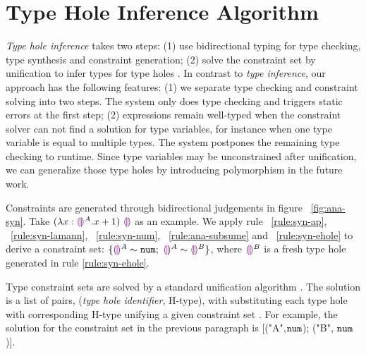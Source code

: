 \section{Type Hole Inference Algorithm}
\label{sec:infalg}
\emph{Type hole inference} takes two steps: (1) use bidirectional typing for type checking, type synthesis and constraint generation; (2) solve the constraint set by unification to infer types for type holes \cite{TaplBook}. In contrast to \emph{type inference}, our approach has the following features: (1) we separate type checking and constraint solving into two steps. The system only does type checking and triggers static errors at the first step; (2) expressions remain well-typed when the constraint solver can not find a solution for type variables, for instance when one type variable is equal to multiple types. The system postpones the remaining type checking to runtime. Since  type variables may be unconstrained after unification, we can generalize those type holes by introducing polymorphism in the future work. \par
{} Constraints are generated through bidirectional judgements in figure ~\ref{fig:ana-syn}. Take $(\lambda x:\textcolor{violet}{\llparenthesis}\textcolor{violet}{\rrparenthesis}^A. x+1)~ \textcolor{violet}{\llparenthesis}\textcolor{violet}{\rrparenthesis}$ as an example. We apply rule ~\ref{rule:syn-ap}, ~\ref{rule:syn-lamann}, ~\ref{rule:syn-num}, ~\ref{rule:ana-subsume} and ~\ref{rule:syn-ehole} to derive a constraint set: $\{\textcolor{violet}{\llparenthesis}\textcolor{violet}{\rrparenthesis}^A \sim \mathtt{num};~ \textcolor{violet}{\llparenthesis}\textcolor{violet}{\rrparenthesis}^A \sim \textcolor{violet}{\llparenthesis}\textcolor{violet}{\rrparenthesis}^B\}$, where $\textcolor{violet}{\llparenthesis}\textcolor{violet}{\rrparenthesis}^B$ is a fresh type hole generated in rule \ref{rule:syn-ehole}. \par
{} Type constraint sets are solved by a standard unification algorithm \cite{RobinUnification}. The solution is a list of pairs, (\emph{type hole  identifier}, H-type), with substituting each type hole with corresponding H-type unifying a given constraint set \cite{TaplBook}. For example, the solution for the constraint set in the previous paragraph is [("A",$\mathtt{num}$); ("B", $\mathtt{num}$)]. \par 
